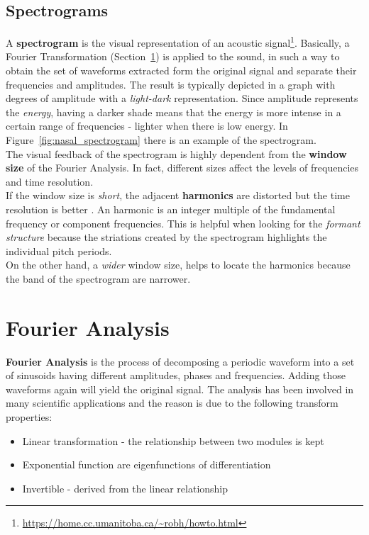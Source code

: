 \subsection{Spectrograms}
\label{sec:spectrograms}
A \textbf{spectrogram} is the visual representation of an acoustic signal\footnote{\url{https://home.cc.umanitoba.ca/~robh/howto.html}}. Basically, a Fourier Transformation (Section~\ref{sec:fourier_analysis}) is applied to the sound, in such a way to obtain the set of waveforms extracted form the original signal and separate their frequencies and amplitudes. The result is typically depicted in a graph with degrees of amplitude with a \textit{light-dark} representation. Since amplitude represents the \textit{energy}, having a darker shade means that the energy is more intense in a certain range of frequencies - lighter when there is low energy. In Figure~\ref{fig:nasal_spectrogram} there is an example of the spectrogram. \\
\noindent The visual feedback of the spectrogram is highly dependent from the \textbf{window size} of the Fourier Analysis. In fact, different sizes affect the levels of frequencies and time resolution. \\
\noindent If the window size is \textit{short}, the adjacent \textbf{harmonics} are distorted but the time resolution is better \cite{spectrogram_def}. An harmonic is an integer multiple of the fundamental frequency or component frequencies. This is helpful when looking for the \textit{formant structure} because the striations created by the spectrogram highlights the individual pitch periods. \\
\noindent On the other hand, a \textit{wider} window size, helps to locate the harmonics because the band of the spectrogram are narrower.


\section{Fourier Analysis}
\label{sec:fourier_analysis}
\textbf{Fourier Analysis} is the process of decomposing a periodic waveform into a set of sinusoids having different amplitudes, phases and frequencies. Adding those waveforms again will yield the original signal. The analysis has been involved in many scientific applications and the reason is due to the following transform properties:

\begin{itemize}
	\item Linear transformation - the relationship between two modules is kept
	\item Exponential function are eigenfunctions of differentiation \cite{evans1997partial}
	\item Invertible - derived from the linear relationship
\end{itemize}

